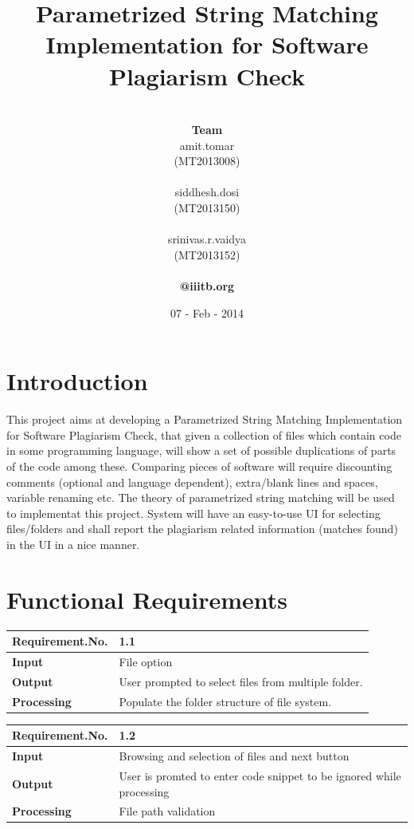 \documentclass[11pt]{article}
\title{\textbf{Parametrized String Matching Implementation for Software Plagiarism Check}}
\author{
		\vspace{ 2 mm}\\		
		\textbf{Team} \\	
		amit.tomar \\
		(MT2013008) \\
		\vspace{ -1 mm}\\		
		siddhesh.dosi\\								     
		(MT2013150) \\		
		\vspace{ -1 mm}\\					
		srinivas.r.vaidya\\
		(MT2013152) \\
		\vspace{ -2 mm}\\		
		\textbf{@iiitb.org}}
\date{07 - Feb - 2014}
\begin{document}
\lstset{language=C} 
\maketitle

\vspace{ 100 mm}

\section{Introduction}

This project aims at developing a Parametrized String Matching Implementation for Software Plagiarism Check, that given a collection of files which contain code in some programming language, will show a set of possible duplications of parts of the code among these. Comparing pieces of software will require discounting comments (optional and language dependent), extra/blank lines and spaces, variable renaming etc. The theory of parametrized string matching will be used to implementat this project. System will have an easy-to-use UI for selecting files/folders and shall report the plagiarism related information (matches found) in the UI in a nice manner.

\section{ Functional Requirements}

  \begin{center}
    \begin{tabular}{ | l | p{10cm} |}
    \hline
    {\textbf{Requirement.No.}} & {1.1} \\ \hline
    \textbf{Input}      & File option \\ \hline
    \textbf{Output}     & User prompted to select files from multiple folder. \\ \hline
    \textbf{Processing} & Populate the folder structure of file system. \\ \hline
    \end{tabular}
\end{center}

  \begin{center}
    \begin{tabular}{ | l | p{10cm} |}
    \hline
    {\textbf{Requirement.No.}} & {1.2} \\ \hline
    \textbf{Input}      & Browsing and selection of files and next button \\ \hline
    \textbf{Output}     & User is promted to enter code snippet to be ignored while processing \\ \hline
    \textbf{Processing} & File path validation \\ \hline
    \end{tabular}
\end{center}
\end{document}
